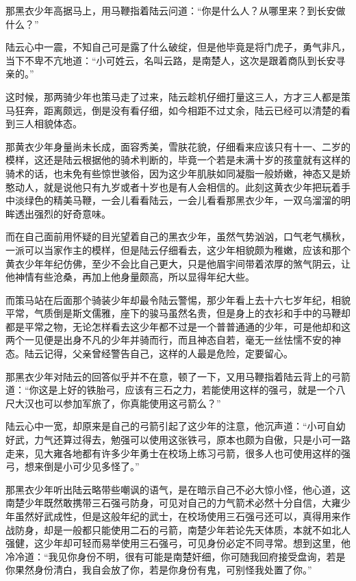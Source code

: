 那黑衣少年高据马上，用马鞭指着陆云问道：“你是什么人？从哪里来？到长安做什么？”

陆云心中一震，不知自己可是露了什么破绽，但是他毕竟是将门虎子，勇气非凡，当下不卑不亢地道：“小可姓云，名叫云路，是南楚人，这次是跟着商队到长安寻亲的。”

这时候，那两骑少年也策马走了过来，陆云趁机仔细打量这三人，方才三人都是策马狂奔，距离颇远，倒是没有看仔细，如今相距不过丈余，陆云已经可以清楚的看到三人相貌体态。

那黄衣少年身量尚未长成，面容秀美，雪肤花貌，仔细看来应该只有十一、二岁的模样，这还是陆云根据他的骑术判断的，毕竟一个若是未满十岁的孩童就有这样的骑术的话，也未免有些惊世骇俗，因为这少年肌肤如同凝脂一般娇嫩，神态又是娇憨动人，就是说他只有九岁或者十岁也是有人会相信的。此刻这黄衣少年把玩着手中淡绿色的精美马鞭，一会儿看看陆云，一会儿看看那黑衣少年，一双乌溜溜的明眸透出强烈的好奇意味。

而在自己面前用怀疑的目光望着自己的黑衣少年，虽然气势汹汹，口气老气横秋，一派可以当家作主的模样，但是陆云仔细看去，这少年相貌颇为稚嫩，应该和那个黄衣少年年纪仿佛，至少不会比自己更大，只是他眉宇间带着浓厚的煞气阴云，让他神情有些沧桑，再加上他身量颇高，所以显得年纪大些。

而策马站在后面那个骑装少年却最令陆云警惕，那少年看上去十六七岁年纪，相貌平常，气质倒是斯文儒雅，座下的骏马虽然名贵，但是身上的衣衫和手中的马鞭却都是平常之物，无论怎样看去这少年都不过是一个普普通通的少年，可是他却和这两个一见便是出身不凡的少年并骑而行，而且神态自若，毫无一丝怯懦不安的神态。陆云记得，父亲曾经警告自己，这样的人最是危险，定要留心。

那黑衣少年对陆云的回答似乎并不在意，顿了一下，又用马鞭指着陆云背上的弓箭道：“你这是上好的铁胎弓，应该有三石之力，若能使用这样的强弓，就是一个八尺大汉也可以参加军旅了，你真能使用这弓箭么？”

陆云心中一宽，却原来是自己的弓箭引起了这少年的注意，他沉声道：“小可自幼好武，力气还算过得去，勉强可以使用这张铁弓，原本也颇为自傲，只是小可一路走来，见大雍各地都有许多少年勇士在校场上练习弓箭，很多人也可使用这样的强弓，想来倒是小可少见多怪了。”

那黑衣少年听出陆云略带些嘲讽的语气，是在暗示自己不必大惊小怪，他心道，这南楚少年既然敢携带三石强弓防身，可见对自己的力气箭术必然十分自信，大雍少年虽然好武成性，但是这般年纪的武士，在校场使用三石强弓还可以，真得用来作战防身，却是一般都只能使用二石的弓箭，南楚少年若论先天体质，本就不如北人强健，这少年却可轻而易举使用三石强弓，可见身份必定不同寻常。想到这里，他冷冷道：“我见你身份不明，很有可能是南楚奸细，你可随我回府接受盘询，若是你果然身份清白，我自会放了你，若是你身份有鬼，可别怪我处置了你。”

